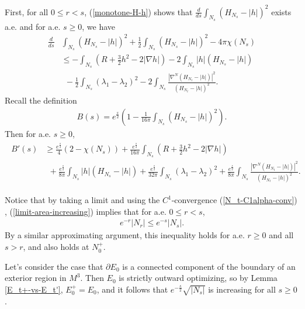 \documentclass[11pt, letterpaper]{amsart}
\theoremstyle{definition}
\theoremstyle{remark}
\begin{document}
First, for all $0 \leq r<s$,  (\ref{monotone-H-h}) shows that $\frac{d}{d s} \int_{N_s} \left( H_{N_s} - |h| \right) ^2 $ exists a.e. and  for a.e. $s \geq 0$, we have
	\begin{align*}
		\frac{d}{d s} & \int_{N_s} \left( H_{N_s} - |h| \right) ^2 + \frac{1}{2} \int_{N_s} \left( H_{N_s} - |h| \right) ^2 - 4 \pi \chi (N_s) \\
		&\leq -\int_{N_s} \left( R + \frac{3}{2} h ^2 - 2|\nabla h| \right) -2 \int_{N_s} |h| (H_{N_s}- |h|)\\
		&\ \ - \frac{1}{2} \int_{N_s} (\lambda _1 - \lambda _2)^2 - 2  \int_{{N}_s}   \frac{|{\nabla }^{N} (H_{{N}_t} -|h|)|^2}{(H_{{N}_t} - |h|)^2} .
	\end{align*} 
Recall the definition
\begin{align}\label{defn-B(s)}
		B(s)= e ^{\frac{s}{2}}\left( 1- \frac{1}{16 \pi } \int_{N_s} (H_{N_s} - |h| )^2 \right). 
	\end{align}
Then for a.e. $s \geq 0$,
\begin{align}\label{B'(s)-ineq}
	\begin{split}
		B'(s) &\geq \frac{e ^{\frac{s}{2}}}{4} \left( 2- \chi (N_s) \right) + \frac{e ^{\frac{s}{2}}}{16 \pi } \int_{N_s} \left( R + \frac{3}{2} h ^2 - 2|\nabla h| \right) \\
	&\ \ + \frac{e ^{\frac{s}{2}}}{8 \pi } \int_{N_s} |h| (H_{N_s}- |h|)  + \frac{e^{\frac{s}{2}}}{32 \pi } \int_{N_s} (\lambda _1- \lambda _2)^2 + \frac{e ^{\frac{s}{2}}}{8\pi }  \int_{{N}_s}   \frac{|{\nabla }^{N} (H_{{N}_t} -|h|)|^2}{(H_{{N}_t} - |h|)^2} .
	\end{split}
\end{align}




Notice that by taking a limit and using the $C^1$-convergence (\ref{N_t-C1alpha-conv}) , (\ref{limit-area-increasing}) implies that for a.e. $0\leq r< s$,
\begin{align}\label{e-t-Nt-monotone}
	e ^{-r} |N_r| \leq e ^{-s} |N_s|.
\end{align} 
By a similar approximating argument, this inequality holds for a.e. $r \geq 0$ and all $s>r$, and also holds at $N_0 ^{+}$. 

Let's consider the case that $\partial E_0$ is a connected component of the boundary of an exterior region in $M^3$. Then $E_0$ is strictly outward optimizing, so by Lemma \ref{E_t+-vs-E_t'}, $E_0^+ = E_0$, and it follows that $e ^{- \frac{s}{2}} \sqrt{|N_s|} $ is increasing for all $s \geq 0$.
\end{document}
